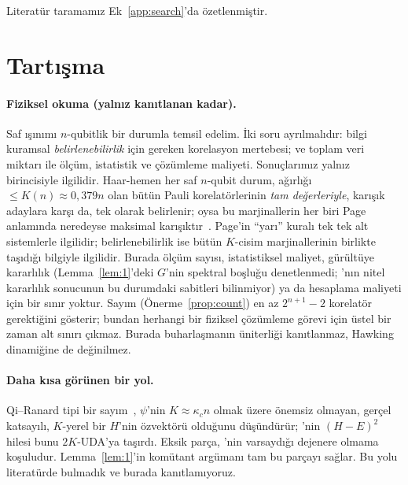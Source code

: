 \documentclass[aps,pra,onecolumn,superscriptaddress,nofootinbib,longbibliography,10pt]{revtex4-2}
\theoremstyle{definition}
\newcommand{\kc}{\kappa_c}
\begin{document}
Literatür taramamız Ek~\ref{app:search}'da özetlenmiştir.

\section{Tartışma}\label{sec:disc}
\paragraph*{Fiziksel okuma (yalnız kanıtlanan kadar).} Saf ışınımı $n$-qubitlik bir durumla temsil edelim. İki soru ayrılmalıdır: bilgi kuramsal \emph{belirlenebilirlik} için gereken korelasyon mertebesi; ve toplam veri miktarı ile ölçüm, istatistik ve çözümleme maliyeti. Sonuçlarımız yalnız birincisiyle ilgilidir. Haar-hemen her saf $n$-qubit durum, ağırlığı $\le K(n)\approx0{,}379n$ olan bütün Pauli korelatörlerinin \emph{tam değerleriyle}, karışık adaylara karşı da, tek olarak belirlenir; oysa bu marjinallerin her biri Page anlamında neredeyse maksimal karışıktır~\cite{Pag93a}. Page'in ``yarı'' kuralı tek tek alt sistemlerle ilgilidir; belirlenebilirlik ise bütün $K$-cisim marjinallerinin birlikte taşıdığı bilgiyle ilgilidir. Burada ölçüm sayısı, istatistiksel maliyet, gürültüye kararlılık (Lemma~\ref{lem:1}'deki $G$'nin spektral boşluğu denetlenmedi; \cite{YSCZ26}'nın nitel kararlılık sonucunun bu durumdaki sabitleri bilinmiyor) ya da hesaplama maliyeti için bir sınır yoktur. Sayım (Önerme~\ref{prop:count}) en az $2^{n+1}-2$ korelatör gerektiğini gösterir; bundan herhangi bir fiziksel çözümleme görevi için üstel bir zaman alt sınırı çıkmaz. Burada buharlaşmanın üniterliği kanıtlanmaz, Hawking dinamiğine de değinilmez.

\paragraph*{Daha kısa görünen bir yol.} Qi--Ranard tipi bir sayım~\cite{QR19}, $\psi$'nin $K\approx\kc n$ olmak üzere önemsiz olmayan, gerçel katsayılı, $K$-yerel bir $H$'nin özvektörü olduğunu düşündürür; \cite{CJWZ12}'nin $(H-E)^2$ hilesi bunu $2K$-UDA'ya taşırdı. Eksik parça, \cite{CJWZ12}'nin varsaydığı dejenere olmama koşuludur. Lemma~\ref{lem:1}'in komütant argümanı tam bu parçayı sağlar. Bu yolu literatürde bulmadık ve burada kanıtlamıyoruz.
\end{document}
